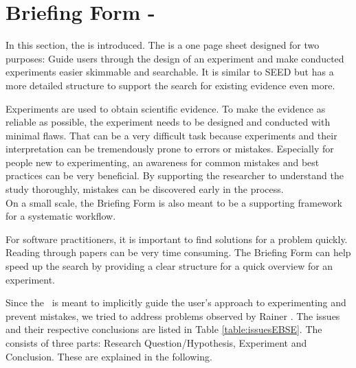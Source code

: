 
\section{Briefing Form - \briefingform}
\label{sec:briefing form}

In this section, the \textit{\briefingform} is introduced. The \briefingform is a one page sheet designed for two purposes: Guide users through the design of an experiment and make conducted experiments easier skimmable and searchable. It is similar to SEED but has a more detailed structure to support the search for existing evidence even more.

Experiments are used to obtain scientific evidence. To make the evidence as reliable as possible, the experiment needs to be designed and conducted with minimal flaws. That can be a very difficult task because experiments and their interpretation can be tremendously prone to errors or mistakes. Especially for people new to experimenting, an awareness for common mistakes and best practices can be very beneficial. By supporting the researcher to understand the study thoroughly, mistakes can be discovered early in the process.\\
On a small scale, the Briefing Form is also meant to be a  supporting framework for a systematic workflow.

For software practitioners, it is important to find solutions for a problem quickly. Reading through papers can be very time consuming. The Briefing Form can help speed up the search by providing a clear structure for a quick overview for an experiment.

Since the \briefingform~is meant to implicitly guide the user's approach to experimenting and prevent mistakes, we tried to address problems observed  by Rainer \etal \cite{Rainer2006}. The issues and their respective conclusions are listed in Table \ref{table:issuesEBSE}. The \briefingform consists of three parts: Research Question/Hypothesis, Experiment and Conclusion. These are explained in the following.\\

